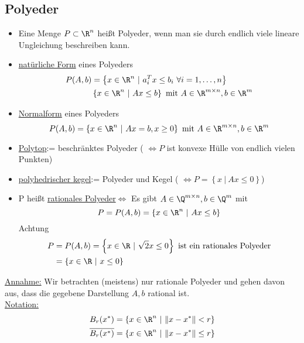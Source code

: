 \subsection{Polyeder}
\begin{definition}
	\begin{itemize}
		\item Eine Menge $P\subset \R^n$ heißt Polyeder, wenn man sie durch endlich viele lineare Ungleichung beschreiben kann.
		\item \underline{natürliche Form} eines Polyeders
			\begin{align*}
				P(A,b) &= \left\{ x \in \R^n\ | \ a^{T}_{i} x \leq b_{i} \ \forall i =1,\dots ,n \right\}\\
					   & \left\{ x \in \R^n \ | \ Ax \leq b \right\} \text{ mit } A \in\R^{m\times n}, b\in \R^m
			\end{align*}
		\item \underline{Normalform} eines Polyeders	
			\begin{equation*}
				P(A,b) = \left\{ x \in \R^n \ | \ Ax = b, x\geq 0 \right\} \text{ mit } A \in\R^{m\times n}, b\in \R^m
			\end{equation*}
		\item \underline{Polytop}:= beschränktes Polyeder ( $\iff P$ ist konvexe Hülle von endlich vielen Punkten)	
		\item \underline{polyhedrischer kegel}:= Polyeder und Kegel ( $\iff P = \left\{x \ | \ Ax \leq 0 \right\}$)
		\item P heißt \underline{rationales Polyeder}$\iff$ Es gibt $A\in\Q^{m \times n}, b \in \Q^m$ mit 
			\begin{equation*}
				P = P(A,b) = \left\{ x \in \R^n\ | \ Ax \leq b \right\}
			\end{equation*}
			Achtung 
			\begin{align*}
				P &= P(A,b) = \left\{ x \in \R\ | \ \sqrt{2}x \leq 0 \right\} \text{ ist ein rationales Polyeder}\\
				  &= \left\{x \in \R \ | \ x \leq 0  \right\}
			\end{align*}
	\end{itemize}
\end{definition}
\underline{Annahme:} Wir betrachten (meistens) nur rationale Polyeder und gehen davon aus, dass die gegebene Darstellung $A,b$ rational ist.\\
\underline{Notation:}
\begin{align*}
	B_{r}(x^*) &= \left\{ x \in \R^n \ | \ \|x - x^*\|<r \right\}\\
	\overline{B_{r}(x^*)} &= \left\{ x \in \R^n \ | \ \|x - x^*\|\leq r \right\}
\end{align*}
